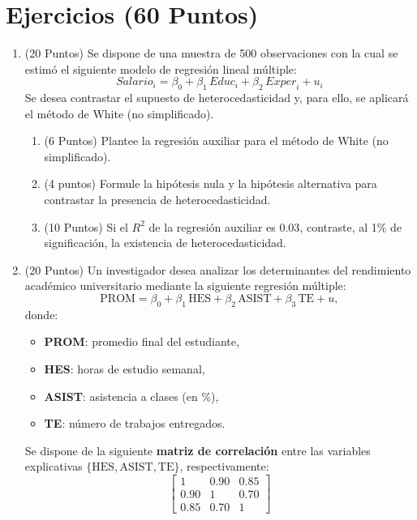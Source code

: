 \documentclass[10pt,a4paper]{article}
\begin{document}
\section{Ejercicios (60 Puntos)}

\begin{enumerate}

\item (20 Puntos) Se dispone de una muestra de 500 observaciones con la cual se estimó el siguiente modelo de regresión lineal múltiple:
$$Salario_i = \beta_0 + \beta_1\,\textit{Educ}_i + \beta_2\,\textit{Exper}_i + u_i$$
Se desea contrastar el supuesto de heterocedasticidad y, para ello, se aplicará el método de White (no simplificado).
\begin{enumerate}
    \item (6 Puntos) Plantee la regresión auxiliar para el método de White (no simplificado).
    
    \item (4 puntos) Formule la hipótesis nula y la hipótesis alternativa para contrastar la presencia de heterocedasticidad.
    
    \item (10 Puntos) Si el $R^2$ de la regresión auxiliar es $0.03$, contraste, al 1\% de significación, la existencia de heterocedasticidad.

\end{enumerate}

\item (20 Puntos) Un investigador desea analizar los determinantes del rendimiento académico universitario mediante la siguiente regresión múltiple:
\[
\text{PROM} = \beta_0 + \beta_1 \,\text{HES} + \beta_2 \,\text{ASIST} + \beta_3 \,\text{TE} + u,
\]
donde:
\begin{itemize}
  \item \textbf{PROM}: promedio final del estudiante,
  \item \textbf{HES}: horas de estudio semanal,
  \item \textbf{ASIST}: asistencia a clases (en \%),
  \item \textbf{TE}: número de trabajos entregados.
\end{itemize}

Se dispone de la siguiente \textbf{matriz de correlación} entre las variables explicativas \(\{\text{HES}, \text{ASIST}, \text{TE}\}\), respectivamente:
\[
\begin{bmatrix}
1 & 0.90 & 0.85 \\
0.90 & 1 & 0.70 \\
0.85 & 0.70 & 1
\end{bmatrix}
\]


\end{enumerate}
\end{document}

